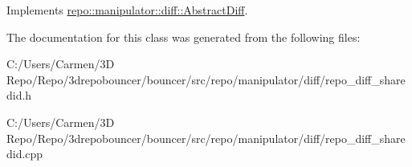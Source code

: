 Implements \hyperlink{classrepo_1_1manipulator_1_1diff_1_1_abstract_diff_a0c1780f099a434120e65835bd1514ebf}{repo\+::manipulator\+::diff\+::\+Abstract\+Diff}.



The documentation for this class was generated from the following files\+:\begin{DoxyCompactItemize}
\item 
C\+:/\+Users/\+Carmen/3\+D Repo/\+Repo/3drepobouncer/bouncer/src/repo/manipulator/diff/repo\+\_\+diff\+\_\+sharedid.\+h\item 
C\+:/\+Users/\+Carmen/3\+D Repo/\+Repo/3drepobouncer/bouncer/src/repo/manipulator/diff/repo\+\_\+diff\+\_\+sharedid.\+cpp\end{DoxyCompactItemize}

